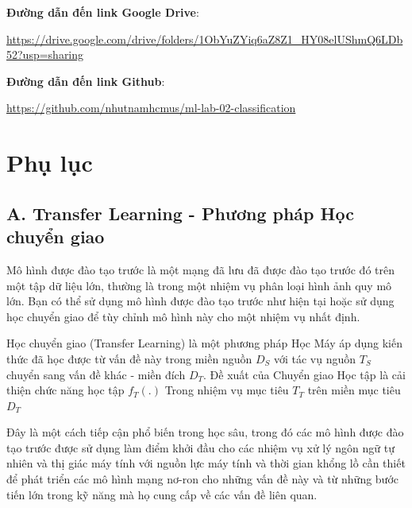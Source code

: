 \documentclass{article}
\begin{document}
	\textbf{Đường dẫn đến link Google Drive}:
	
	 \href{https://drive.google.com/drive/folders/1ObYuZYiq6aZ8Z1_HY08elUShmQ6LDb52?usp=sharing}{https://drive.google.com/drive/folders/1ObYuZYiq6aZ8Z1\_HY08elUShmQ6LDb52?usp=sharing}
	 
	 
	\textbf{Đường dẫn đến link Github}:
	
	\href{https://github.com/nhutnamhcmus/ml-lab-02-classification}{https://github.com/nhutnamhcmus/ml-lab-02-classification}
	
	
	\section{Phụ lục}
	
	\subsection{A. Transfer Learning - Phương pháp Học chuyển giao}
	Mô hình được đào tạo trước là một mạng đã lưu đã được đào tạo trước đó trên một tập dữ liệu lớn, thường là trong một nhiệm vụ phân loại hình ảnh quy mô lớn. Bạn có thể sử dụng mô hình được đào tạo trước như hiện tại hoặc sử dụng học chuyển giao để tùy chỉnh mô hình này cho một nhiệm vụ nhất định.
	
	Học chuyển giao (Transfer Learning) là một phương pháp Học Máy áp dụng kiến thức đã học được từ vấn đề này trong miền nguồn $ D_{S} $ với tác vụ nguồn $ T_{S}$ chuyển sang vấn đề khác - miền đích $ D_{T} $. Đề xuất của Chuyển giao Học tập là cải thiện chức năng học tập $f_{T}(.)$ Trong nhiệm vụ mục tiêu $ T_{T} $ trên miền mục tiêu $D_{T}$
	
	Đây là một cách tiếp cận phổ biến trong học sâu, trong đó các mô hình được đào tạo trước được sử dụng làm điểm khởi đầu cho các nhiệm vụ xử lý ngôn ngữ tự nhiên và thị giác máy tính với nguồn lực máy tính và thời gian khổng lồ cần thiết để phát triển các mô hình mạng nơ-ron cho những vấn đề này và từ những bước tiến lớn trong kỹ năng mà họ cung cấp về các vấn đề liên quan.
	
\end{document}
